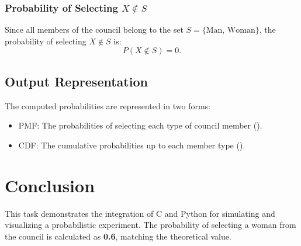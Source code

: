 \documentclass[journal]{IEEEtran}
\begin{document}
\subsubsection*{Probability of Selecting \( X \notin S \)}
Since all members of the council belong to the set \( S = \{\text{Man, Woman}\} \), the probability of selecting \( X \notin S \) is:
\[
P(X \notin S) = 0.
\]

\subsection*{Output Representation}
The computed probabilities are represented in two forms:
\begin{itemize}
    \item PMF: The probabilities of selecting each type of council member ().
    \item CDF: The cumulative probabilities up to each member type ().
\end{itemize}


\section*{Conclusion}
This task demonstrates the integration of C and Python for simulating and visualizing a probabilistic experiment. The probability of selecting a woman from the council is calculated as \textbf{0.6}, matching the theoretical value.
\end{document}
